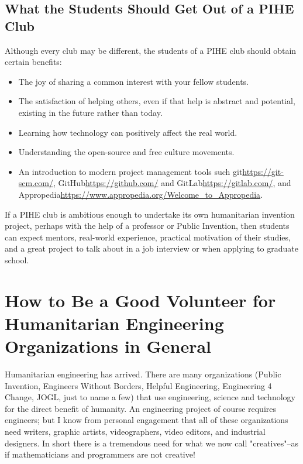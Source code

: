 \documentclass[
	fontsize=10pt, %
	twoside=false, %
	secnumdepth=1, %
]{kaobook}
\begin{document}
\section{What the Students Should Get Out of a PIHE Club}

Although every club may be different, the students of a PIHE club should obtain certain benefits:
\begin{itemize}
\item The joy of sharing a common interest with your fellow students.
\item The satisfaction of helping others, even if that help is abstract and potential, existing in the future rather than today.
\item Learning how technology can positively affect the real world.
\item Understanding the open-source and free culture movements.
\item An introduction to modern project management tools such git\url{https://git-scm.com/}, GitHub\url{https://github.com/} and GitLab\url{https://gitlab.com/}, and Appropedia\url{https://www.appropedia.org/Welcome_to_Appropedia}.
\end{itemize}

If a PIHE club is ambitious enough to undertake its own humanitarian
invention project, perhaps with the help of a professor or Public
Invention, then students can expect mentors, real-world experience,
practical motivation of their studies, and a great project to talk
about in a job interview or when applying to graduate school.




\chapter{How to Be a Good Volunteer for Humanitarian Engineering Organizations in General}


Humanitarian engineering has arrived. There are many organizations (Public Invention, Engineers Without Borders, Helpful Engineering, Engineering 4 Change, JOGL, just to name a few) that use engineering, science and technology for the direct benefit of humanity. An engineering project of course requires engineers; but I know from personal engagement that all of these organizations need writers, graphic artists, videographers, video editors, and industrial designers. In short there is a tremendous need for what we now call "creatives"--as if mathematicians and programmers are not creative!
\end{document}
